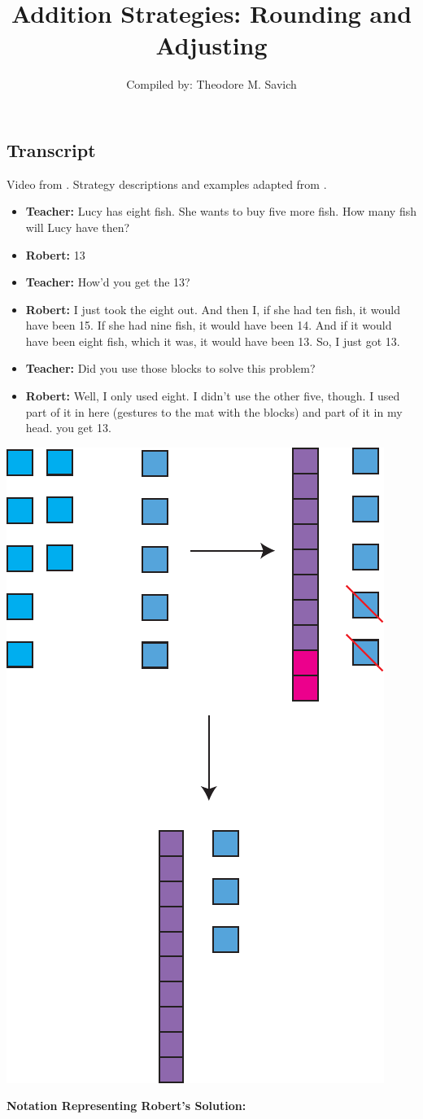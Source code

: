 \documentclass[11pt]{article}
\title{Addition Strategies: Rounding and Adjusting}
\author{Compiled by: Theodore M. Savich}
\begin{document}
\maketitle

\subsection*{Transcript}
Video from \textcite{Carpenter1999}. Strategy descriptions and examples adapted from \textcite{HackenbergCourseNotes}. 
\begin{itemize}
\item \textbf{Teacher:} Lucy has eight fish. She wants to buy five more fish. How many fish will Lucy have then?
 

\item \textbf{Robert:} 13 

\item \textbf{Teacher:} How'd you get the 13?

\item \textbf{Robert:} I just took the eight out. And then I, if she had ten fish, it would have been 15. If she had nine fish, it would have been 14. And if it would have been eight fish, which it was, it would have been 13. So, I just got 13. 

\item \textbf{Teacher:} Did you use those blocks to solve this problem?

\item \textbf{Robert:} Well, I only used eight. I didn't use the other five, though. I used part of it in here (gestures to the mat with the blocks) and part of it in my head. you get 13.
\end{itemize}

\includegraphics[width=.25\textwidth]{images/Easy_Pictures/SAR_ADD_Rounding/PDF/SAR_ADD_Rounding.pdf}

\noindent \textbf{Notation Representing Robert's Solution:}
\end{document}
